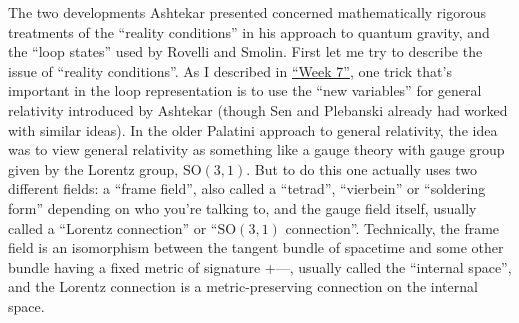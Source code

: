 \documentclass{article}
\begin{document}
The two developments Ashtekar presented concerned mathematically
rigorous treatments of the ``reality conditions'' in his approach to
quantum gravity, and the ``loop states'' used by Rovelli and Smolin.
First let me try to describe the issue of ``reality conditions''. As I
described in \protect\hyperlink{week7}{``Week 7''}, one trick that's
important in the loop representation is to use the ``new variables'' for
general relativity introduced by Ashtekar (though Sen and Plebanski
already had worked with similar ideas). In the older Palatini approach
to general relativity, the idea was to view general relativity as
something like a gauge theory with gauge group given by the Lorentz
group, \(\mathrm{SO}(3,1)\). But to do this one actually uses two
different fields: a ``frame field'', also called a ``tetrad'',
``vierbein'' or ``soldering form'' depending on who you're talking to,
and the gauge field itself, usually called a ``Lorentz connection'' or
``\(\mathrm{SO}(3,1)\) connection''. Technically, the frame field is an
isomorphism between the tangent bundle of spacetime and some other
bundle having a fixed metric of signature +---, usually called the
``internal space'', and the Lorentz connection is a metric-preserving
connection on the internal space.
\end{document}
